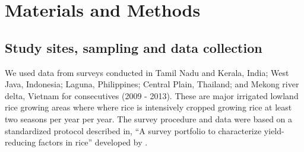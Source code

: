 \section*{Materials and Methods}

\subsection*{Study sites, sampling and data collection}
We used data from surveys conducted in Tamil Nadu  and Kerala, India; West Java, Indonesia; Laguna, Philippines; Central Plain, Thailand; and Mekong river delta, Vietnam for consecutives (2009 - 2013). These are major irrigated lowland rice growing areas where where rice is intensively cropped growing rice at least two seasons per year per year. The survey procedure and data were based on a standardized protocol described  in, ``A survey portfolio to characterize yield-reducing factors in rice'' developed by \citet{Savarysurvey2009}.